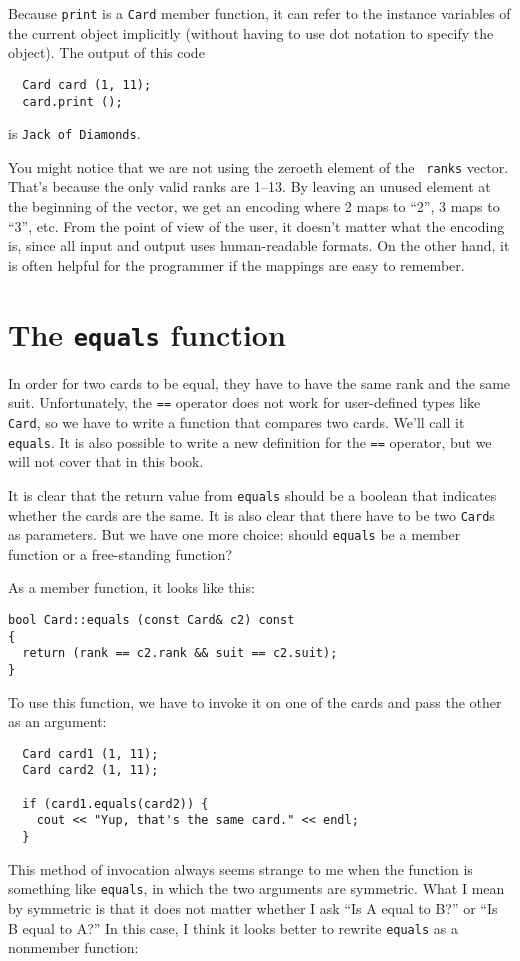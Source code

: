 Because {\tt print} is a {\tt Card} member function,
it can refer to the instance variables of the current object
implicitly (without having to use dot notation to specify the
object).  The output of this code

\begin{verbatim}
  Card card (1, 11);
  card.print ();
\end{verbatim}
%
is {\tt Jack of Diamonds}.

You might notice that we are not using the zeroeth element of the {\tt
ranks} vector.  That's because the only valid ranks are 1--13.  By
leaving an unused element at the beginning of the vector, we get an
encoding where 2 maps to ``2'', 3 maps to ``3'', etc.  From the point
of view of the user, it doesn't matter what the encoding is, since all
input and output uses human-readable formats.  On the other hand, it
is often helpful for the programmer if the mappings are easy
to remember.

\section{The {\tt equals} function}

In order for two cards to be equal, they have to have the same rank
and the same suit.  Unfortunately, the {\tt ==} operator does not work
for user-defined types like {\tt Card}, so we have to write a function
that compares two cards.  We'll call it {\tt equals}.  It is also
possible to write a new definition for the {\tt ==} operator, but we
will not cover that in this book.

It is clear that the return value from {\tt equals} should be a
boolean that indicates whether the cards are the same.  It is
also clear that there have to be two {\tt Card}s as parameters.
But we have one more choice: should {\tt equals} be a member
function or a free-standing function?

As a member function, it looks like this:

\begin{verbatim}
bool Card::equals (const Card& c2) const
{
  return (rank == c2.rank && suit == c2.suit);
}
\end{verbatim}
%
To use this function, we have to invoke it on one of the
cards and pass the other as an argument:

\begin{verbatim}
  Card card1 (1, 11);
  Card card2 (1, 11);

  if (card1.equals(card2)) {
    cout << "Yup, that's the same card." << endl;
  }
\end{verbatim}
%
This method of invocation always seems strange to me when the
function is something like {\tt equals}, in which the two
arguments are symmetric.  What I mean by symmetric is that it
does not matter whether I ask ``Is A equal to B?'' or
``Is B equal to A?''  In this case, I think it looks better to rewrite
{\tt equals} as a nonmember function:

